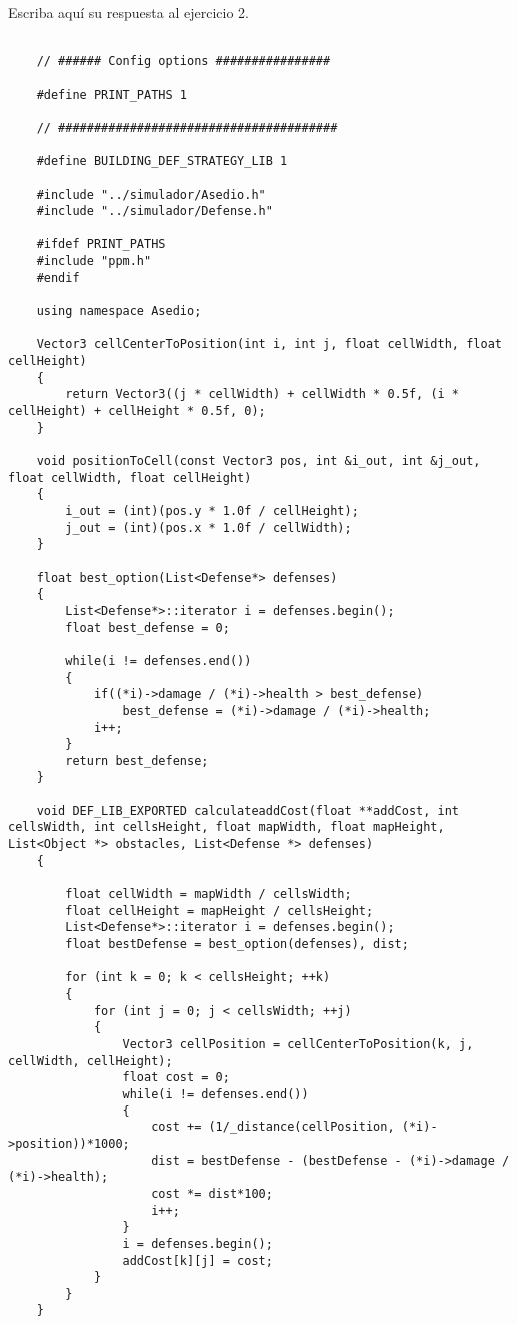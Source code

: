Escriba aquí su respuesta al ejercicio 2.

\begin{lstlisting}
    
    // ###### Config options ################

    #define PRINT_PATHS 1
    
    // #######################################
    
    #define BUILDING_DEF_STRATEGY_LIB 1
    
    #include "../simulador/Asedio.h"
    #include "../simulador/Defense.h"
    
    #ifdef PRINT_PATHS
    #include "ppm.h"
    #endif
    
    using namespace Asedio;
    
    Vector3 cellCenterToPosition(int i, int j, float cellWidth, float cellHeight)
    {
        return Vector3((j * cellWidth) + cellWidth * 0.5f, (i * cellHeight) + cellHeight * 0.5f, 0);
    }
    
    void positionToCell(const Vector3 pos, int &i_out, int &j_out, float cellWidth, float cellHeight)
    {
        i_out = (int)(pos.y * 1.0f / cellHeight);
        j_out = (int)(pos.x * 1.0f / cellWidth);
    }
    
    float best_option(List<Defense*> defenses)
    {
        List<Defense*>::iterator i = defenses.begin();
        float best_defense = 0;
        
        while(i != defenses.end())
        {
            if((*i)->damage / (*i)->health > best_defense)
                best_defense = (*i)->damage / (*i)->health;
            i++;
        }
        return best_defense;
    }
    
    void DEF_LIB_EXPORTED calculateaddCost(float **addCost, int cellsWidth, int cellsHeight, float mapWidth, float mapHeight, List<Object *> obstacles, List<Defense *> defenses)
    {
    
        float cellWidth = mapWidth / cellsWidth;
        float cellHeight = mapHeight / cellsHeight;
        List<Defense*>::iterator i = defenses.begin();
        float bestDefense = best_option(defenses), dist;
    
        for (int k = 0; k < cellsHeight; ++k)
        {
            for (int j = 0; j < cellsWidth; ++j)
            {
                Vector3 cellPosition = cellCenterToPosition(k, j, cellWidth, cellHeight);
                float cost = 0;
                while(i != defenses.end())
                {
                    cost += (1/_distance(cellPosition, (*i)->position))*1000;
                    dist = bestDefense - (bestDefense - (*i)->damage / (*i)->health);
                    cost *= dist*100;
                    i++;
                }
                i = defenses.begin();
                addCost[k][j] = cost;
            }
        }
    }
    

\end{lstlisting}
